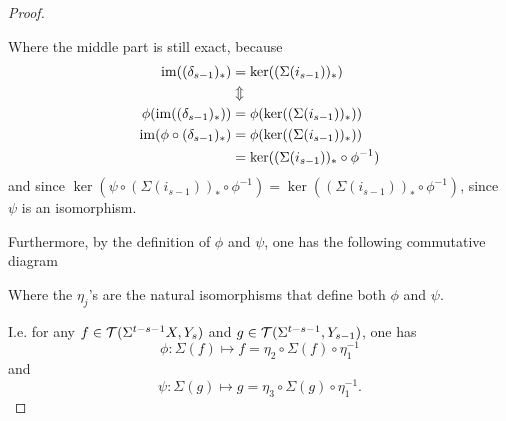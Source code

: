\begin{proof}
\begin{center}
    \end{center}
    Where the middle part is still exact, because
    \begin{align*}
        \operatorname{im}((\delta_{s-1})_*) &= \ker((\Sigma(i_{s-1}))_*) \\
        &\Updownarrow \\
        \phi(\operatorname{im}((\delta_{s-1})_*)) &= \phi(\ker((\Sigma(i_{s-1}))_*)) \\
        \operatorname{im}(\phi \circ (\delta_{s-1})_*) &= \phi(\ker((\Sigma(i_{s-1}))_*)) \\
        &= \ker((\Sigma(i_{s-1}))_* \circ \phi^{-1})
    \end{align*}
    and since \( \ker(\psi \circ (\Sigma(i_{s-1}))_* \circ \phi^{-1}) = \ker((\Sigma(i_{s-1}))_* \circ \phi^{-1}) \), since \( \psi \) is an isomorphism.

    Furthermore, by the definition of \( \phi \) and \( \psi \), one has the following commutative diagram
    \begin{center}
    \end{center}
    Where the \( \eta_j \)'s are the natural isomorphisms that define both \( \phi \) and \( \psi \).
    
    I.e. for any \( f \in {\mathcal{T}}(\Sigma^{t - s - 1} X, Y_s) \) and \( g \in {\mathcal{T}}(\Sigma^{t - s - 1}, Y_{s - 1}) \), one has
    \[
        \phi: \Sigma( f ) \mapsto f = \eta_2 \circ \Sigma( f ) \circ \eta_1^{-1}
    \]
    and
    \[
        \psi: \Sigma( g ) \mapsto g = \eta_3 \circ \Sigma( g ) \circ \eta_1^{-1}.
    \]


\end{proof}
